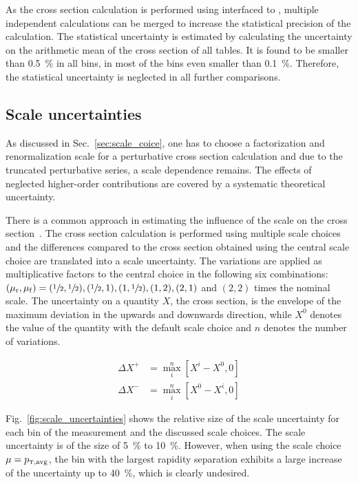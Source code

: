 As the cross section calculation is performed using \fastnlo interfaced to
\NLOJETPP, multiple independent calculations can be merged to increase the
statistical precision of the calculation. The statistical uncertainty is
estimated by calculating the uncertainty on the arithmetic mean of the cross
section of all \fastnlo tables. It is found to be smaller than \SI{0.5}{\percent} in all bins,
in most of the bins even smaller than \SI{0.1}{\percent}. Therefore, the statistical
uncertainty is neglected in all further comparisons.

\subsection{Scale uncertainties}
\label{sec:scale_uncertainties}

As discussed in Sec.~\ref{sec:scale_coice}, one has to choose a factorization
and renormalization scale for a perturbative cross section calculation and due to
the truncated perturbative series, a scale dependence remains. The effects of
neglected higher-order contributions are covered by a systematic theoretical
uncertainty.

There is a common approach in estimating the influence of the scale on the cross
section~\cite{Cacciari:2003fi}. The cross section calculation is performed using
multiple scale choices and the differences compared to the cross section
obtained using the central scale choice are translated into a scale uncertainty.
The variations are applied as multiplicative factors to the central choice in
the following six combinations: $(\mu_{\mathrm{r}}, \mu_{\mathrm{f}}) = (\sfrac{1}{2}, \sfrac{1}{2}),
(\sfrac{1}{2}, 1), (1, \sfrac{1}{2}), (1, 2), (2, 1)$ and $(2, 2)$ times the
nominal scale. The uncertainty on a quantity $X$, \eg the cross section, is the
envelope of the maximum deviation in the upwards and downwards direction, while
$X^0$ denotes the value of the quantity with the default scale choice and $n$
denotes the number of variations.

\begin{align*}
    \Delta X^+ &= \max_{i}^{n} \left[ X^i - X^0, 0 \right]\\
    \Delta X^- &= \max_{i}^{n} \left[ X^0 - X^i, 0 \right]
\end{align*}


Fig.~\ref{fig:scale_uncertainties} shows the relative size of the scale
uncertainty for each bin of the measurement and the discussed scale choices. The
scale uncertainty is of the size of \SI{5}{\percent} to \SI{10}{\percent}. However, when using the scale
choice $\mu=\ptavg$, the bin with the largest rapidity separation exhibits a large
increase of the uncertainty up to \SI{40}{\percent}, which is clearly undesired.

